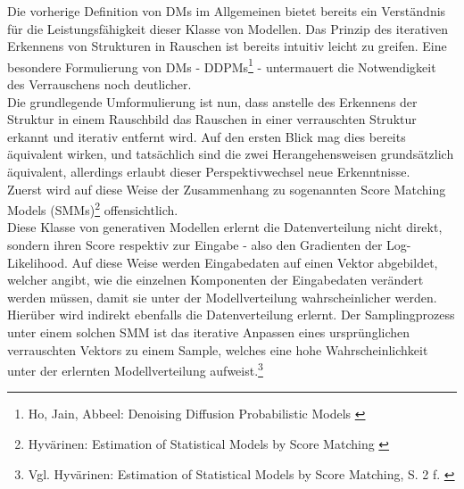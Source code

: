 Die vorherige Definition von \ac{DM}s im Allgemeinen bietet bereits ein Verständnis für die Leistungsfähigkeit dieser Klasse von Modellen. Das Prinzip des iterativen Erkennens von Strukturen in Rauschen ist bereits intuitiv leicht zu greifen. Eine besondere Formulierung von \ac{DM}s - \ac{DDPM}s\footnote{
    Ho, Jain, Abbeel: Denoising Diffusion Probabilistic Models
    \cite{ho2020denoisingdiffusionprobabilisticmodels}
} - untermauert die Notwendigkeit des Verrauschens noch deutlicher. \\
Die grundlegende Umformulierung ist nun, dass anstelle des Erkennens der Struktur in einem Rauschbild das Rauschen in einer verrauschten Struktur erkannt und iterativ entfernt wird. Auf den ersten Blick mag dies bereits äquivalent wirken, und tatsächlich sind die zwei Herangehensweisen grundsätzlich äquivalent, allerdings erlaubt dieser Perspektivwechsel neue Erkenntnisse. \\
Zuerst wird auf diese Weise der Zusammenhang zu sogenannten Score Matching Models (SMMs)\footnote{
    Hyvärinen: Estimation of Statistical Models by Score Matching
    \cite{JMLR:v6:hyvarinen05a}
} offensichtlich. \\
Diese Klasse von generativen Modellen erlernt die Datenverteilung nicht direkt, sondern ihren Score respektiv zur Eingabe - also den Gradienten der Log-Likelihood. Auf diese Weise werden Eingabedaten auf einen Vektor abgebildet, welcher angibt, wie die einzelnen Komponenten der Eingabedaten verändert werden müssen, damit sie unter der Modellverteilung wahrscheinlicher werden. Hierüber wird indirekt ebenfalls die Datenverteilung erlernt. Der Samplingprozess unter einem solchen \ac{SMM} ist das iterative Anpassen eines ursprünglichen verrauschten Vektors zu einem Sample, welches eine hohe Wahrscheinlichkeit unter der erlernten Modellverteilung aufweist.\footnote{
    Vgl. Hyvärinen: Estimation of Statistical Models by Score Matching, S. 2 f.
    \cite{JMLR:v6:hyvarinen05a}
} \\

